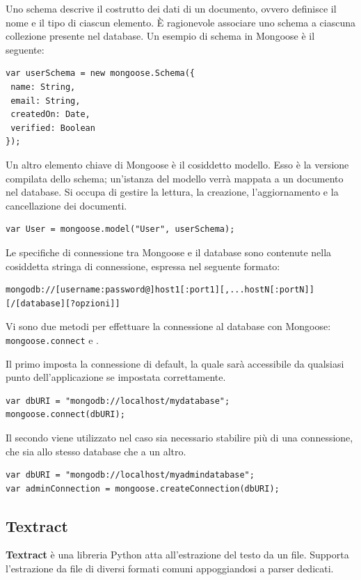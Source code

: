Uno schema descrive il costrutto dei dati di un documento, ovvero definisce il nome e il tipo di ciascun elemento. È ragionevole associare uno schema a ciascuna collezione presente nel database. Un esempio di schema in Mongoose è il seguente:

\begin{lstlisting}
var userSchema = new mongoose.Schema({
 name: String,
 email: String,
 createdOn: Date,
 verified: Boolean
});
\end{lstlisting}

Un altro elemento chiave di Mongoose è il cosiddetto modello. Esso è la versione compilata dello schema; un'istanza del modello verrà mappata a un documento nel database. Si occupa di gestire la lettura, la creazione, l'aggiornamento e la cancellazione dei documenti.\cite{holmes}
\begin{lstlisting}
var User = mongoose.model("User", userSchema);
\end{lstlisting}

Le specifiche di connessione tra Mongoose e il database sono contenute nella cosiddetta stringa di connessione, espressa nel seguente formato:\cite{connection-string}
\begin{lstlisting}
mongodb://[username:password@]host1[:port1][,...hostN[:portN]][/[database][?opzioni]]
\end{lstlisting}

Vi sono due metodi per effettuare la connessione al database con Mongoose: \texttt{mongoose.connect} e .\cite{holmes-connection}

Il primo imposta la connessione di default, la quale sarà accessibile da qualsiasi punto dell'applicazione se impostata correttamente.
\begin{lstlisting}
var dbURI = "mongodb://localhost/mydatabase";
mongoose.connect(dbURI);
\end{lstlisting}
Il secondo viene utilizzato nel caso sia necessario stabilire più di una connessione, che sia allo stesso database che a un altro.
\begin{lstlisting}
var dbURI = "mongodb://localhost/myadmindatabase";
var adminConnection = mongoose.createConnection(dbURI);
\end{lstlisting}

\subsection{Textract}
\textbf{Textract} è una libreria Python atta all'estrazione del testo da un file. Supporta l'estrazione da file di diversi formati comuni appoggiandosi a parser dedicati.

